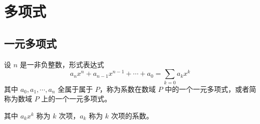 \chapter{多项式}

\section{一元多项式}

\begin{definition}[一元多项式]
	设 $n$ 是一非负整数，形式表达式
	$$a_n x^n + a_{n-1}x^{n-1} + \cdots + a_0=\sum_{k=0}a_k x^k$$
	其中 $a_0,a_1,\cdots,a_n$ 全属于属于 $P$，称为系数在数域 $P$ 中的一个一元多项式，或者简称为数域 $P$ 上的一个一元多项式。
\end{definition}

其中 $a_kx^k$ 称为 $k$ 次项，$a_k$ 称为 $k$ 次项的系数。